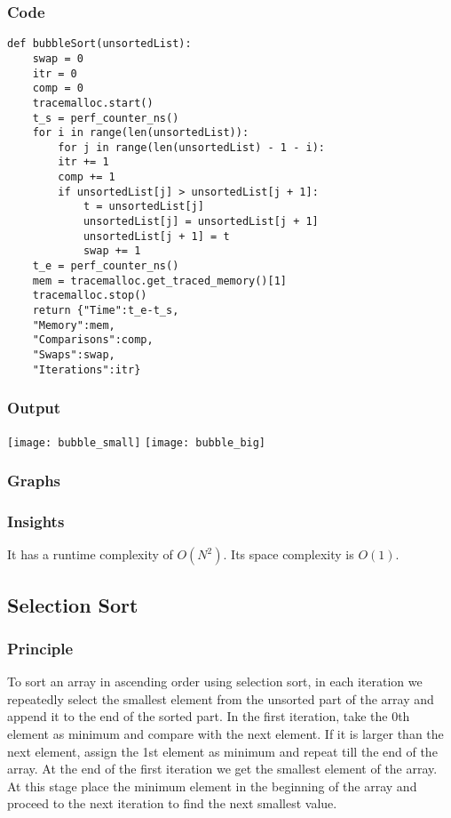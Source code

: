 \documentclass[12pt]{article}
\begin{document}
\subsubsection*{Code}
\begin{verbatim}
def bubbleSort(unsortedList):
	swap = 0
	itr = 0
	comp = 0
	tracemalloc.start()
	t_s = perf_counter_ns()
	for i in range(len(unsortedList)):
		for j in range(len(unsortedList) - 1 - i):
		itr += 1
		comp += 1
		if unsortedList[j] > unsortedList[j + 1]:
			t = unsortedList[j]
			unsortedList[j] = unsortedList[j + 1]
			unsortedList[j + 1] = t
			swap += 1
	t_e = perf_counter_ns()
	mem = tracemalloc.get_traced_memory()[1]
	tracemalloc.stop()
	return {"Time":t_e-t_s,
	"Memory":mem,
	"Comparisons":comp,
	"Swaps":swap,
	"Iterations":itr}
\end{verbatim}
\subsubsection*{Output}
\texttt{[image: bubble\_small]}
\texttt{[image: bubble\_big]}
\subsubsection*{Graphs}





\subsubsection*{Insights}
It has a runtime complexity of $O(N^2)$. Its space complexity is
$O(1)$.
\subsection{Selection Sort}
\subsubsection*{Principle}
To sort an array in ascending order using selection sort, in each
iteration we repeatedly select the smallest element from the
unsorted part of the array and append it to the end of the sorted
part. In the first iteration, take the 0th element as minimum and
compare with the next element. If it is larger than the next
element, assign the 1st element as minimum and repeat till the
end of the array. At the end of the first iteration we get the
smallest element of the array. At this stage place the minimum
element in the beginning of the array and proceed to the next
iteration to find the next smallest value.
\end{document}
